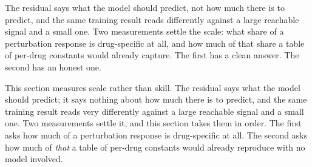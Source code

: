   
\label{sec:methods-vardecomp}

\begin{question}[5]
The residual says what the model should predict, not how much there is to
predict, and the same training result reads differently against a large reachable
signal and a small one. Two measurements settle the scale: what share of a
perturbation response is drug-specific at all, and how much of that share a table
of per-drug constants would already capture. The first has a clean answer. The
second has an honest one.
\end{question}

\noindent
This section measures scale rather than skill. The residual says what the model
should predict; it says nothing about how much there is to predict, and the same
training result reads very differently against a large reachable signal and a
small one. Two measurements settle it, and this section takes them in order. The
first asks how much of a perturbation response is drug-specific at all. The second
asks how much of \emph{that} a table of per-drug constants would already reproduce
with no model involved.

